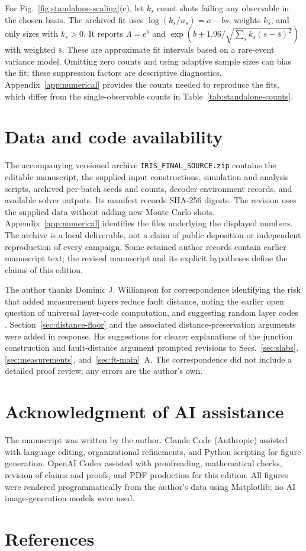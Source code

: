 For Fig.~\ref{fig:standalone-scaling}(c), let $k_s$ count shots failing any
observable in the chosen basis. The archived fit uses
$\log(k_s/n_s)=a-bs$, weights $k_s$, and only sizes with $k_s>0$.
It reports $\Lambda=e^b$ and
$\exp(b\pm1.96/\sqrt{\sum_s k_s(s-\bar s)^2})$ with weighted
$\bar s$. These are approximate fit intervals based on a rare-event
variance model. Omitting zero counts and using adaptive sample sizes can
bias the fit; these suppression factors are descriptive diagnostics.
Appendix~\ref{app:numerical} provides the counts needed to reproduce the
fits, which differ from the single-observable counts in
Table~\ref{tab:standalone-counts}.

\section*{Data and code availability}
The accompanying versioned archive \nolinkurl{IRIS_FINAL_SOURCE.zip}
contains the editable manuscript, the supplied input constructions,
simulation and analysis scripts, archived per-batch seeds and counts,
decoder environment records, and available solver outputs. Its manifest
records SHA-256 digests. The revision uses the supplied data without adding
new Monte Carlo shots. Appendix~\ref{app:numerical} identifies the files
underlying the displayed numbers. The archive is a local deliverable, not a
claim of public deposition or independent reproduction of every campaign.
Some retained author records contain earlier manuscript text; the revised
manuscript and its explicit hypotheses define the claims of this edition.

\begin{acknowledgments}
The author thanks Dominic J. Williamson for correspondence identifying the
risk that added measurement layers reduce fault distance, noting the earlier
open question of universal layer-code computation, and suggesting random
layer codes \cite{GuRandomLayerCodes2026}. Section~\ref{sec:distance-floor}
and the associated distance-preservation arguments were added in response.
His suggestions for clearer explanations of the junction construction and
fault-distance argument prompted revisions to Secs.~\ref{sec:slabs},
\ref{sec:measurements}, and~\ref{sec:ft-main}~A. The correspondence did not
include a detailed proof review; any errors are the author's own.
\end{acknowledgments}

\section*{Acknowledgment of AI assistance}
The manuscript was written by the author. Claude Code (Anthropic) assisted
with language editing, organizational refinements, and Python scripting for
figure generation. OpenAI Codex assisted with proofreading, mathematical
checks, revision of claims and proofs, and PDF production for this edition.
All figures were rendered programmatically from the
author's data using Matplotlib; no AI image-generation models were used.


\clearpage
\onecolumngrid
\section*{References}
\twocolumngrid
\renewcommand{\bibsection}{}

